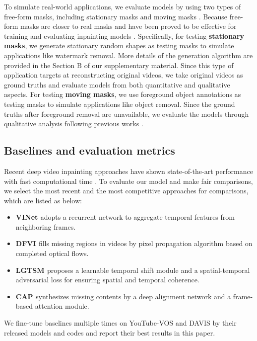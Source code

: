 \documentclass[runningheads]{llncs}
\begin{document}
To simulate real-world applications, we evaluate models by using two types of free-form masks, including stationary masks and moving masks \cite{chang2019learnable,kim2019deep,lee2019copy}. Because free-form masks are closer to real masks and have been proved to be effective for training and evaluating inpainting models \cite{chang2019free,chang2019learnable,liu2018image,nazeri2019edgeconnect}. 
Specifically, for testing \textbf{stationary masks}, we generate stationary random shapes as testing masks to simulate applications like watermark removal. More details of the generation algorithm are provided in the Section B of our supplementary material.
Since this type of application targets at reconstructing original videos, we take original videos as ground truths and evaluate models from both quantitative and qualitative aspects. 
For testing \textbf{moving masks}, we use foreground object annotations as testing masks to simulate applications like object removal. Since the ground truths after foreground removal are unavailable, we evaluate the models through qualitative analysis following previous works \cite{kim2019deep,lee2019copy,xu2019deep}. 


\subsection{Baselines and evaluation metrics}
\label{subsec:base}
Recent deep video inpainting approaches have shown state-of-the-art performance with fast computational time \cite{kim2019deep,lee2019copy,oh2019onion,xu2019deep}. To evaluate our model and make fair comparisons, we select the most recent and the most competitive approaches for comparisons, which are listed as below:
\begin{itemize}[nosep]
   \item \textbf{VINet \cite{kim2019deep}} adopts a recurrent network to aggregate temporal features from neighboring frames. 
   \item \textbf{DFVI \cite{xu2019deep}} fills missing regions in videos by pixel propagation algorithm based on completed optical flows.
   \item \textbf{LGTSM \cite{chang2019learnable}} proposes a learnable temporal shift module and a spatial-temporal adversarial loss for ensuring spatial and temporal coherence. 
   \item \textbf{CAP \cite{lee2019copy}} synthesizes missing contents by a deep alignment network and a frame-based attention module. 
\end{itemize}
We fine-tune baselines multiple times on YouTube-VOS \cite{xu2018youtube} and DAVIS \cite{caelles20182018} by their released models and codes and report their best results in this paper. 
\end{document}
